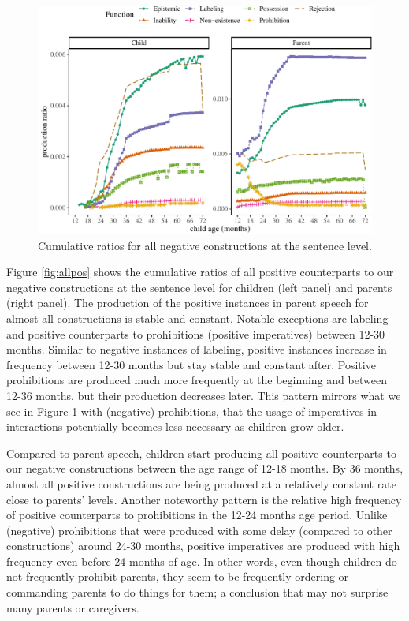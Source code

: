 \documentclass[
  english,
  man,floatsintext]{apa6}
\begin{document}
\begin{figure}[H]

{\centering \includegraphics{neg_construction_article_files/figure-latex/allneg-1} 

}

\caption{Cumulative ratios for all negative constructions at the sentence level.}\label{fig:allneg}
\end{figure}

Figure \ref{fig:allpos} shows the cumulative ratios of all positive counterparts to our negative constructions at the sentence level for children (left panel) and parents (right panel). The production of the positive instances in parent speech for almost all constructions is stable and constant. Notable exceptions are labeling and positive counterparts to prohibitions (positive imperatives) between 12-30 months. Similar to negative instances of labeling, positive instances increase in frequency between 12-30 months but stay stable and constant after. Positive prohibitions are produced much more frequently at the beginning and between 12-36 months, but their production decreases later. This pattern mirrors what we see in Figure \ref{fig:allneg} with (negative) prohibitions, that the usage of imperatives in interactions potentially becomes less necessary as children grow older.

Compared to parent speech, children start producing all positive counterparts to our negative constructions between the age range of 12-18 months. By 36 months, almost all positive constructions are being produced at a relatively constant rate close to parents' levels. Another noteworthy pattern is the relative high frequency of positive counterparts to prohibitions in the 12-24 months age period. Unlike (negative) prohibitions that were produced with some delay (compared to other constructions) around 24-30 months, positive imperatives are produced with high frequency even before 24 months of age. In other words, even though children do not frequently prohibit parents, they seem to be frequently ordering or commanding parents to do things for them; a conclusion that may not surprise many parents or caregivers.
\end{document}
